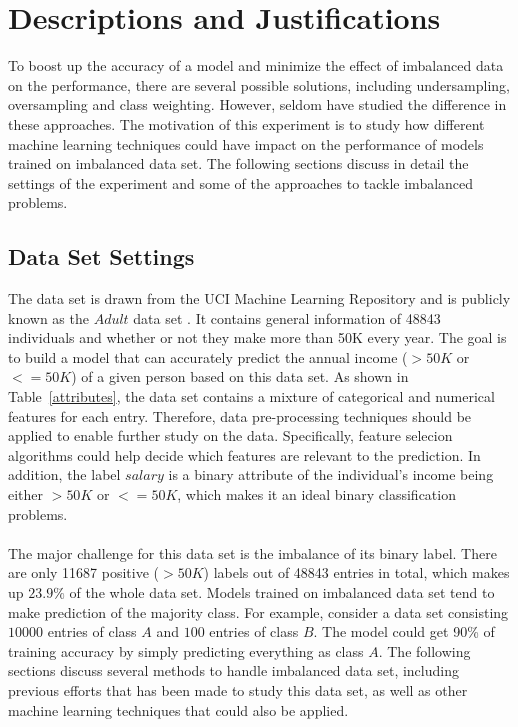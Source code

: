\documentclass{article}
\begin{document}
\section{Descriptions and Justifications}
\label{headings}

To boost up the accuracy of a model and minimize the effect of imbalanced data on the performance, there are several possible solutions, including undersampling, oversampling and class weighting. However, seldom have studied the difference in these approaches. The motivation of this experiment is to study how different machine learning techniques could have impact on the performance of models trained on imbalanced data set. The following sections discuss in detail the settings of the experiment and some of the approaches to tackle imbalanced problems.

\subsection{Data Set Settings}
The data set is drawn from the UCI Machine Learning Repository and is publicly known as the $Adult$ data set \citep{Adult}. It contains general information of 48843 individuals and whether or not they make more than 50K every year. The goal is to build a model that can accurately predict the annual income ($>50K$ or $<=50K$) of a given person based on this data set. As shown in Table~\ref{attributes}, the data set contains a mixture of categorical and numerical features for each entry. Therefore, data pre-processing techniques should be applied to enable further study on the data. Specifically, feature selecion algorithms could help decide which features are relevant to the prediction. In addition, the label $salary$ is a binary attribute of the individual's income being either $>50K$ or $<=50K$, which makes it an ideal binary classification problems.\\\\
The major challenge for this data set is the imbalance of its binary label. There are only 11687 positive ($>50K$) labels out of 48843 entries in total, which makes up $23.9\%$ of the whole data set. Models trained on imbalanced data set tend to make prediction of the majority class. For example, consider a data set consisting $10000$ entries of class $A$ and $100$ entries of class $B$. The model could get 90\% of training accuracy by simply predicting everything as class $A$. The following sections discuss several methods to handle imbalanced data set, including previous efforts that has been made to study this data set, as well as other machine learning techniques that could also be applied.
\end{document}
